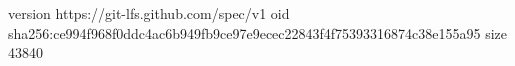 version https://git-lfs.github.com/spec/v1
oid sha256:ce994f968f0ddc4ac6b949fb9ce97e9ecec22843f4f75393316874c38e155a95
size 43840
